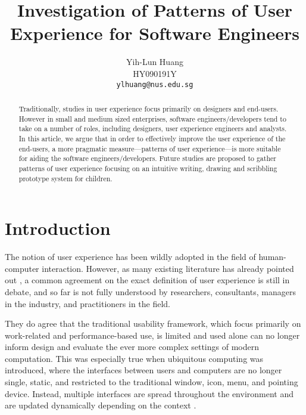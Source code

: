 \documentclass[a4paper,titlepage]{article}
\begin{document}
\title{Investigation of Patterns of User Experience for Software
  Engineers}

\author{Yih-Lun Huang\\
HY090191Y\\
\texttt{ylhuang@nus.edu.sg}}

\maketitle


\begin{abstract}
Traditionally, studies in user experience focus primarily on designers
and end-users. However in small and medium sized enterprises, software
engineers/developers tend to take on a number of roles, including
designers, user experience engineers and analysts. In this article, we
argue that in order to effectively improve the user experience of the
end-users, a more pragmatic measure---patterns of user experience---is
more suitable for aiding the software engineers/developers. Future
studies are proposed to gather patterns of user experience focusing on
an intuitive writing, drawing and scribbling prototype system for
children.
\end{abstract}


\tableofcontents
\newpage


\section{Introduction}
\label{sec:introduction}
The notion of user experience has been wildly adopted in the field of
human-computer interaction. However, as many existing literature has
already pointed out \citep{ux:hassenzahl, ux:law}, a common agreement
on the exact definition of user experience is still in debate, and so
far is not fully understood by researchers, consultants, managers in
the industry, and practitioners in the field.

They do agree that the traditional usability framework, which focus
primarily on work-related and performance-based use, is limited and
used alone can no longer inform design and evaluate the ever more
complex settings of modern computation. This was especially true when
ubiquitous computing was introduced, where the interfaces between
users and computers are no longer single, static, and restricted to
the traditional window, icon, menu, and pointing device. Instead,
multiple interfaces are spread throughout the environment and are
updated dynamically depending on the context \citep{windows:bolter}.
\end{document}
